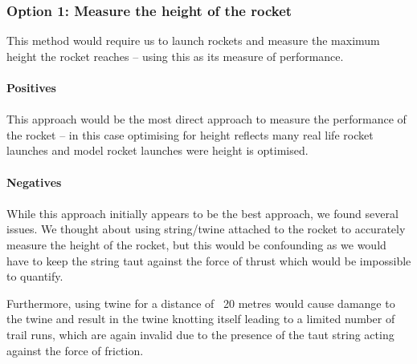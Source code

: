 \documentclass[14pt]{article}
\begin{document}
\subsubsection{Option 1: Measure the height of the rocket}

This method would require us to launch rockets and measure the maximum height the rocket reaches -- using this as its measure of performance.
\paragraph{Positives}
\paragraph{}
This approach would be the most direct approach to measure the performance of the rocket --  in this case optimising for height reflects many real life rocket launches and model rocket launches were height is optimised.
\paragraph{Negatives}
\paragraph{}
While this approach initially appears to be the best approach, we found several issues. 
We thought about using string/twine attached to the rocket to accurately measure the height of the rocket, but this would be confounding as we would have to keep the string taut against the force of thrust which would be impossible to quantify. 

Furthermore, using twine for a distance of ~20 metres would cause damange to the twine and result in the twine knotting itself leading to a limited number of trail runs, which are again invalid due to the presence of the taut string acting against the force of friction.
\end{document}
